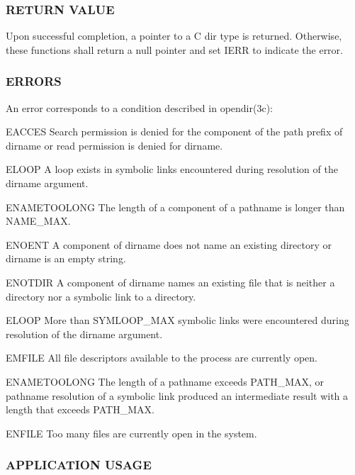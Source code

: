 \subsubsection*{R\+E\+T\+U\+RN V\+A\+L\+UE}

Upon successful completion, a pointer to a C dir type is returned. Otherwise, these functions shall return a null pointer and set I\+E\+RR to indicate the error.

\subsubsection*{E\+R\+R\+O\+RS}

\begin{DoxyVerb}    An error corresponds to a condition described in opendir(3c):

    EACCES    Search permission is denied for the component of the
              path prefix of dirname or read permission is denied
              for dirname.

    ELOOP     A loop exists in symbolic links encountered during
              resolution of the dirname argument.

    ENAMETOOLONG  The length of a component of a pathname is longer than {NAME_MAX}.

    ENOENT        A component of dirname does not name an existing directory or dirname is an empty string.

    ENOTDIR       A component of dirname names an existing file that is neither a directory nor a symbolic link to a directory.

    ELOOP         More than {SYMLOOP_MAX} symbolic links were encountered during resolution of the dirname argument.

    EMFILE        All file descriptors available to the process are currently open.

    ENAMETOOLONG  The length of a pathname exceeds {PATH_MAX},
                  or pathname resolution of a symbolic link produced an intermediate
                  result with a length that exceeds {PATH_MAX}.

    ENFILE        Too many files are currently open in the system.
\end{DoxyVerb}


\subsubsection*{A\+P\+P\+L\+I\+C\+A\+T\+I\+ON U\+S\+A\+GE}

